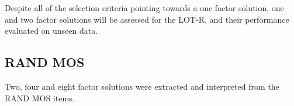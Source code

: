 \documentclass{article}
\begin{document}

Despite all of the selection criteria pointing towards a one factor solution, one and two factor solutions will be assessed for the LOT-R, and their performance evaluated on unseen data. 






\subsection{RAND MOS}
\label{sec:rand-mos-1}
Two, four and eight  factor solutions were extracted and interpreted from the RAND MOS items. 
\end{document}
